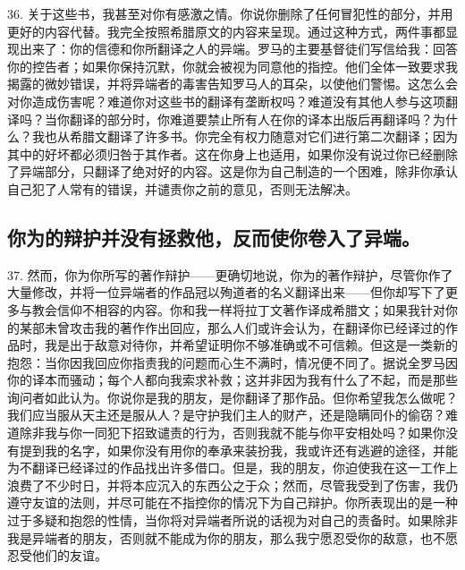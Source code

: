 36. 关于这些书，我甚至对你有感激之情。你说你删除了任何冒犯性的部分，并用更好的内容代替。我完全按照希腊原文的内容来呈现。通过这种方式，两件事都显现出来了：你的信德和你所翻译之人的异端。罗马的主要基督徒们写信给我：回答你的控告者；如果你保持沉默，你就会被视为同意他的指控。他们全体一致要求我揭露的微妙错误，并将异端者的毒害告知罗马人的耳朵，以使他们警惕。这怎么会对你造成伤害呢？难道你对这些书的翻译有垄断权吗？难道没有其他人参与这项翻译吗？当你翻译的部分时，你难道要禁止所有人在你的译本出版后再翻译吗？为什么？我也从希腊文翻译了许多书。你完全有权力随意对它们进行第二次翻译；因为其中的好坏都必须归咎于其作者。这在你身上也适用，如果你没有说过你已经删除了异端部分，只翻译了绝对好的内容。这是你为自己制造的一个困难，除非你承认自己犯了人常有的错误，并谴责你之前的意见，否则无法解决。\par


\subsection{你为的辩护并没有拯救他，反而使你卷入了异端。}

37. 然而，你为你所写的著作辩护——更确切地说，你为的著作辩护，尽管你作了大量修改，并将一位异端者的作品冠以殉道者的名义翻译出来——但你却写下了更多与教会信仰不相容的内容。你和我一样将拉丁文著作译成希腊文；如果我针对你的某部未曾攻击我的著作作出回应，那么人们或许会认为，在翻译你已经译过的作品时，我是出于敌意对待你，并希望证明你不够准确或不可信赖。但这是一类新的抱怨：当你因我回应你指责我的问题而心生不满时，情况便不同了。据说全罗马因你的译本而骚动；每个人都向我索求补救；这并非因为我有什么了不起，而是那些询问者如此认为。你说你是我的朋友，是你翻译了那作品。但你希望我怎么做呢？我们应当服从天主还是服从人？是守护我们主人的财产，还是隐瞒同仆的偷窃？难道除非我与你一同犯下招致谴责的行为，否则我就不能与你平安相处吗？如果你没有提到我的名字，如果你没有用你的奉承来装扮我，我或许还有逃避的途径，并能为不翻译已经译过的作品找出许多借口。但是，我的朋友，你迫使我在这一工作上浪费了不少时日，并将本应沉入的东西公之于众；然而，尽管我受到了伤害，我仍遵守友谊的法则，并尽可能在不指控你的情况下为自己辩护。你所表现出的是一种过于多疑和抱怨的性情，当你将对异端者所说的话视为对自己的责备时。如果除非我是异端者的朋友，否则就不能成为你的朋友，那么我宁愿忍受你的敌意，也不愿忍受他们的友谊。\par

